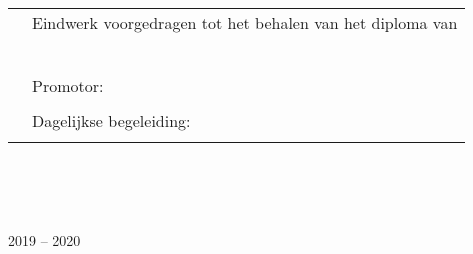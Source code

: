 \documentclass[main_adjusted]{subfiles}
\begin{document}
\begin{center}
	\begin{Huge}
		\textsf{\TITEL}\\[4mm]
	\end{Huge}
	\begin{LARGE}
		\textsf{\SUBTITEL}
	\end{LARGE}
\end{center}
\vfill
\begin{tabular}{p{}p{}}
	& Eindwerk voorgedragen tot het behalen van het diploma van
	\RICHTING\\
	& \\
	& \begin{Large}\textbf{\NAAM}\end{Large}\\
	& \\
	& Promotor:\\
	& \hspace{4mm}\begin{large}\PROMOTOR\end{large}\\
	& Dagelijkse begeleiding:\\
	& \hspace{4mm}\begin{large}\BEGELEIDER\end{large}\\
\end{tabular}
\\
\\
\\
\begin{center}
	2019 -- 2020
\end{center}
\cleardoublepage
\end{document}
